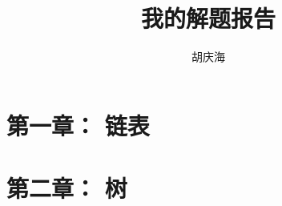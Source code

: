 \documentclass{book}
\begin{document}
\begin{CJK}{UTF8}{gbsn}     %
\title{我的解题报告}
\author{胡庆海}
\date{}

\maketitle

\tableofcontents

\chapter{第一章： 链表}


\chapter{第二章： 树}


\end{CJK}
\end{document}
